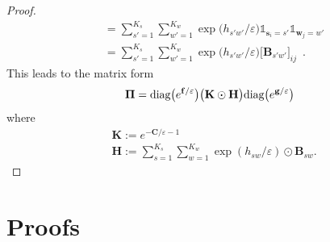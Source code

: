 \documentclass{article}
\theoremstyle{definition}
\begin{document}
\begin{proof}
\begin{align*}
            &= \sum\limits_{s'=1}^{K_s}\sum\limits_{w'=1}^{K_w}\exp\big(h_{s'w'}  / \varepsilon\big) \mathds{1}_{\mathbf{s}_i=s'}\mathds{1}_{\mathbf{w}_j=w'}\\
            &=  \sum\limits_{s'=1}^{K_s}\sum\limits_{w'=1}^{K_w}\exp\big(h_{s'w'}  / \varepsilon\big) \big[\mathbf{B}_{s'w'}\big]_{ij}\enspace .
        \end{align*}
        This leads to the matrix form 
        \begin{align*}
            \mathbf{\Pi} = \textnormal{diag}\big(e^{\mathbf{f}/\varepsilon}\big)\big(\mathbf{K} \odot \mathbf{H}\big)\textnormal{diag}\big(e^{\mathbf{g}/\varepsilon}\big)
        \end{align*}
        where 
        \begin{align*}
             & \mathbf{K} := e^{-\mathbf{C}/\varepsilon-1}\\
             & \mathbf{H} := \sum\limits_{s=1}^{K_s}\sum\limits_{w=1}^{K_w} \exp({h_{sw}/\varepsilon})\odot\mathbf{B}_{sw}.
        \end{align*}
    \end{proof}
\section{Proofs}
\end{document}
